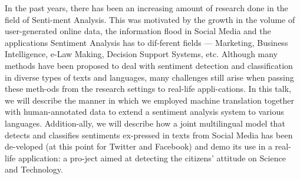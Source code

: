 In the past years, there has been an increasing amount of research done in the field of Senti-ment Analysis. This was motivated by the growth in the volume of user-generated online data, the information flood in Social Media and the applications Sentiment Analysis has to dif-ferent fields --- Marketing, Business Intelligence, e-Law Making, Decision Support Systems, etc. Although many methods have been proposed to deal with sentiment detection and classification in diverse types of texts and languages, many challenges still arise when passing these meth-ods from the research settings to real-life appli-cations. In this talk, we will describe the manner in which we employed machine translation together with human-annotated data to extend a sentiment analysis system to various languages. Addition-ally, we will describe how a joint multilingual model that detects and classifies sentiments ex-pressed in texts from Social Media has been de-veloped (at this point for Twitter and Facebook) and demo its use in a real-life application: a pro-ject aimed at detecting the citizens' attitude on Science and Technology.
